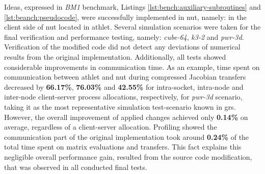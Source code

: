 Ideas, expressed in \textit{BM1} benchmark, Listings \ref{lst:bench:auxiliary-subroutines} and \ref{lst:beanch:pseudocode}, were successfully implemented in \acrshort{nut}, namely: in the client side of \acrshort{nut} located in \acrshort{athlet}. Several simulation scenarios were taken for the final verification and performance testing, namely: \textit{cube-64}, \textit{k3-2} and \textit{pwr-3d}. Verification of the modified code did not detect any deviations of numerical results from the original implementation. Additionally, all tests showed considerable improvements in communication time. As an example, time spent on communication between \acrshort{athlet} and \acrshort{nut} during compressed Jacobian transfers decreased by \textbf{66.17\%}, \textbf{76.03\%} and \textbf{42.55\%} for intra-socket, intra-node and inter-node client-server process allocations, respectively, for \textit{pwr-3d} scenario, taking it as the most representative simulation test-scenario known in \acrshort{grs}. However, the overall improvement of applied changes achieved only \textbf{0.14\%} on average, regardless of a client-server allocation. Profiling showed the communication part of the original implementation took around \textbf{0.24\%} of the total time spent on matrix evaluations and transfers. This fact explains this negligible overall performance gain, resulted from the source code modification, that was observed in all conducted final tests.\\
